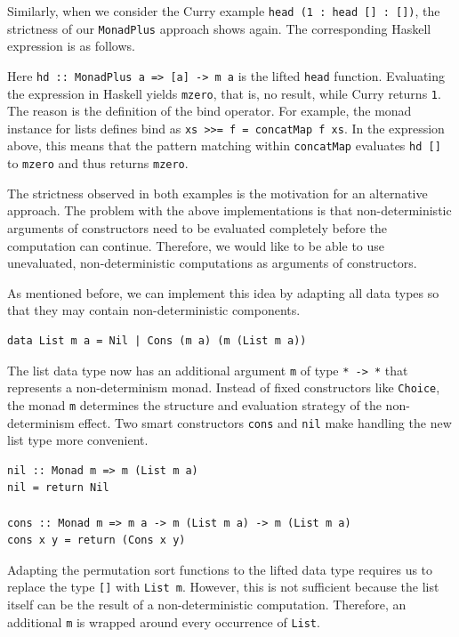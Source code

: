 \documentclass[a4paper, 11pt, fleqn, twoside]{scrreprt}
\newcommand{\hinl}[1]{\texttt{#1}}
\begin{document}
Similarly, when we consider the Curry example \hinl{head (1 : head [] : [])}, the strictness of our \hinl{MonadPlus} approach shows again.
The corresponding Haskell expression is as follows.


Here \hinl{hd :: MonadPlus a => [a] -> m a} is the lifted \hinl{head} function.
Evaluating the expression in Haskell yields \hinl{mzero}, that is, no result, while Curry returns \hinl{1}.
The reason is the definition of the bind operator.
For example, the monad instance for lists defines bind as \hinl{xs >>= f = concatMap f xs}.
In the expression above, this means that the pattern matching within \hinl{concatMap} evaluates \hinl{hd []} to \hinl{mzero} and thus returns \hinl{mzero}.

The strictness observed in both examples is the motivation for an alternative approach.
The problem with the above implementations is that non-deterministic arguments of constructors need to be evaluated completely before the computation can continue.
Therefore, we would like to be able to use unevaluated, non-deterministic computations as arguments of constructors.

As mentioned before, we can implement this idea by adapting all data types so that they may contain non-deterministic components.

\begin{verbatim}
data List m a = Nil | Cons (m a) (m (List m a))
\end{verbatim}

The list data type now has an additional argument \hinl{m} of type \hinl{* -> *} that represents a non-determinism monad.
Instead of fixed constructors like \hinl{Choice}, the monad \hinl{m} determines the structure and evaluation strategy of the non-determinism effect.
Two smart constructors \hinl{cons} and \hinl{nil} make handling the new list type more convenient.

\begin{verbatim}
nil :: Monad m => m (List m a)
nil = return Nil

cons :: Monad m => m a -> m (List m a) -> m (List m a)
cons x y = return (Cons x y)
\end{verbatim}

Adapting the permutation sort functions to the lifted data type requires us to replace the type \hinl{[]} with \hinl{List m}.
However, this is not sufficient because the list itself can be the result of a non-deterministic computation.
Therefore, an additional \hinl{m} is wrapped around every occurrence of \hinl{List}.
\end{document}
